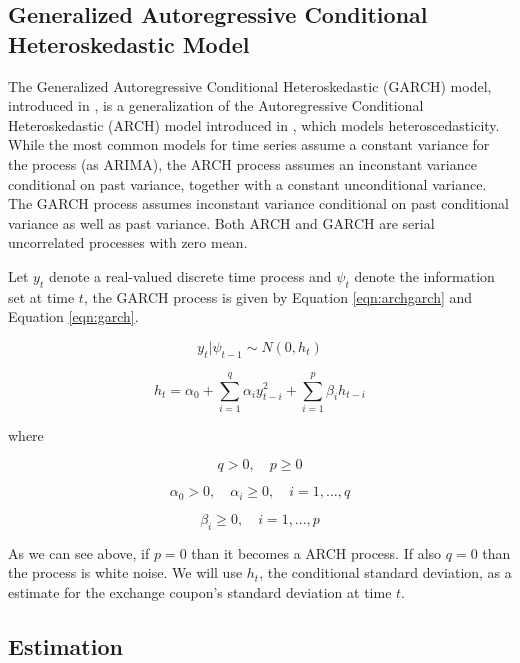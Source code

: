 \documentclass[cic,tc, english]{iiufrgs}
\begin{document}
\subsection{Generalized Autoregressive Conditional Heteroskedastic Model}

    The Generalized Autoregressive Conditional Heteroskedastic (GARCH) model, introduced in \citet{bollerslev1986}, is a generalization of the Autoregressive Conditional Heteroskedastic (ARCH) model introduced in \citet{engle1982}, which models heteroscedasticity. While the most common models for time series assume a constant variance for the process (as ARIMA), the ARCH process assumes an inconstant variance conditional on past variance, together with a constant unconditional variance. The GARCH process assumes inconstant variance conditional on past conditional variance as well as past variance. Both ARCH and GARCH are serial uncorrelated processes with zero mean.

    Let $y_t$ denote a real-valued discrete time process and $\psi_t$ denote the information set at time $t$,  the GARCH process is given by Equation \ref{eqn:archgarch} and Equation \ref{eqn:garch}.

    \begin{equation}
        \label{eqn:archgarch}
        y_t | \psi_{t-1} \sim N(0,h_t)
    \end{equation}

    \begin{equation}
        \label{eqn:garch}
        h_t = \alpha_0 + \displaystyle\sum_{i=1}^{q} \alpha_i y_{t-i}^2 + \displaystyle\sum_{i=1}^{p} \beta_i h_{t-i}
    \end{equation}

    where

    $$q > 0, \quad   p \geq 0$$

    $$\alpha_0 > 0, \quad  \alpha_i \geq 0, \quad  i=1,...,q$$

    $$\beta_i \geq 0, \quad  i=1,...,p$$

    As we can see above, if $p = 0$ than it becomes a ARCH process. If also $q = 0$ than the process is white noise. We will use $h_t$, the conditional standard deviation, as a estimate for the exchange coupon's standard deviation at time $t$.

\subsection{Estimation} \label{chapter_estimation}
\end{document}
